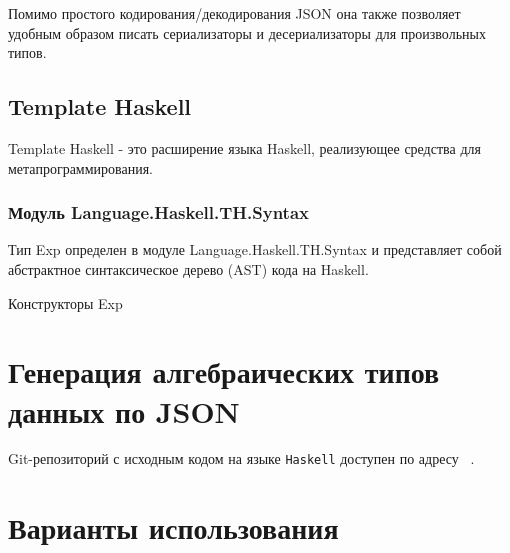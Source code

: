 Помимо простого кодирования/декодирования JSON она также позволяет удобным образом писать сериализаторы и десериализаторы для произвольных типов.

\section{Template Haskell}

Template Haskell - это расширение языка Haskell, реализующее средства для метапрограммирования.~\cite{extensionHub}

\subsection{Модуль Language.Haskell.TH.Syntax~\cite{coverHaskell}}

Тип Exp определен в модуле Language.Haskell.TH.Syntax и представляет собой абстрактное синтаксическое дерево (AST) кода на Haskell.~\cite{thSyntax}

\begin{ListingEnv}[H]
\begin{Verb}

\end{Verb}
\caption{Конструкторы Exp}
\label{listing:expConstr}
\end{ListingEnv}

\chapter{Генерация алгебраических типов данных по JSON}
Git-репозиторий с исходным кодом на языке \lstinline{Haskell} доступен по адресу ~\cite{diploma}. 


\chapter{Варианты использования}


\printbibliography[%
    heading=bibintoc%
]


